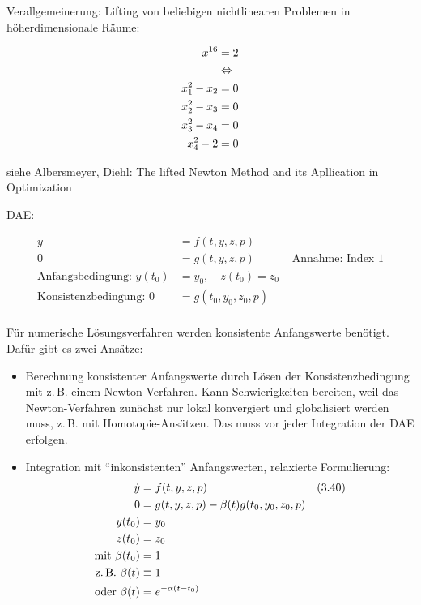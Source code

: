 Verallgemeinerung: Lifting von beliebigen nichtlinearen Problemen in höherdimensionale Räume:

\begin{align*}
x^{16} &= 2 \\
&\Leftrightarrow \\
x_1^2 - x_2 &= 0 \\
x_2^2 - x_3 &= 0 \\
x_3^2 - x_4 &= 0 \\
x_4^2 -  2  &= 0 \\
\end{align*}

siehe Albersmeyer, Diehl: The lifted Newton Method and its Apllication in Optimization


DAE:

\begin{align*}
\dot y &= f(t,y,z,p) \\
0 &= g(t,y,z,p) & \text{ Annahme: Index 1}\\
\text{Anfangsbedingung: } y(t_0) &= y_0, \quad z(t_0) = z_0\\
\text{Konsistenzbedingung: } 0 &= g(t_0, y_0, z_0, p) \\
\end{align*}

Für numerische Lösungsverfahren werden konsistente Anfangswerte benötigt. Dafür gibt es zwei Ansätze:

\begin{itemize}
\item Berechnung konsistenter Anfangswerte durch Lösen der Konsistenzbedingung mit z.\,B. einem Newton-Verfahren. Kann Schwierigkeiten bereiten, weil das Newton-Verfahren zunächst nur lokal konvergiert und globalisiert werden muss, z.\,B. mit Homotopie-Ansätzen. Das muss vor jeder Integration der DAE erfolgen.
\item Integration mit "`inkonsistenten"' Anfangswerten, relaxierte Formulierung:
\begin{align*}
\dot y &= f(t,y,z,p) & (3.40) \\
0 &= g(t,y,z,p) - \beta(t) g(t_0,y_0,z_0,p) \\
y(t_0) &= y_0 \\
z(t_0) &= z_0 \\
\text{mit } \beta(t_0) &= 1 \\
\text{z.\,B. } \beta(t) &\equiv 1 \\
\text{oder } \beta(t) &= e^{-\alpha(t-t_0)} \\
\end{align*}
\end{itemize}

